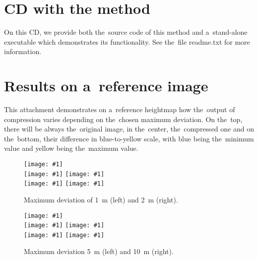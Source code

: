 \appendix

%
%
%
%
%

\openright

\chapter{CD with the method}
\label{att:cd}
On this CD, we provide both the~source code of this method and a~stand-alone executable which demonstrates its functionality. See the~file readme.txt for more information.


\chapter{Results on a~reference image}
\label{att:res_ref}

This attachment demonstrates on a~reference heightmap how the~output of compression varies depending on the~chosen maximum deviation. On the~top, there will be always the~original image, in the~center, the~compressed one and on the~bottom, their difference in blue-to-yellow scale, with blue being the~minimum value and yellow being the~maximum value.

\newcommand{\incref}[1]{\texttt{[image: \#1]}}


\begin{figure}
	\begin{center}
		\incref{figures/out_0.png} \\ 
		\incref{figures/out_1.png}   \incref{figures/out_2.png} \\ 
		\incref{figures/out_diff_1.png}  \incref{figures/out_diff_2.png}
	\end{center}
	\caption{Maximum deviation of 1~m (left) and 2~m (right).}
\end{figure}


\begin{figure}
	\begin{center}
		\incref{figures/out_0.png} \\ 
		\incref{figures/out_5.png}  \incref{figures/out_10.png} \\ 
		\incref{figures/out_diff_5.png}  \incref{figures/out_diff_10.png} \\ 
	\end{center}
	\caption{Maximum deviation 5~m (left) and 10~m (right).}
\end{figure}


